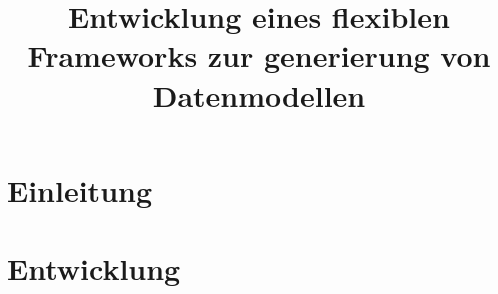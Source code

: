 \documentclass{book}
\title{Entwicklung eines flexiblen Frameworks zur generierung von Datenmodellen}
\begin{document}
\maketitle
\tableofcontents
\chapter{Einleitung}

\chapter{Entwicklung}

\end{document}
